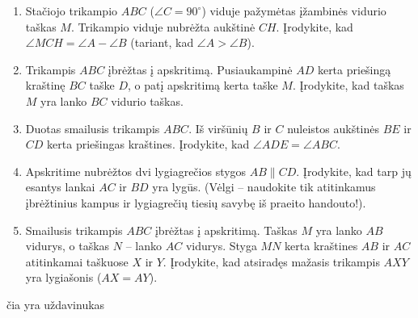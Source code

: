\documentclass[11pt,a4paper]{scrartcl}
\begin{document}
\begin{enumerate}
\begin{itemize}
    \end{itemize}
    \textit{(Šis uždavinys – tai įvadas į kitą mūsų modulį!)}
    \item Stačiojo trikampio $ABC$ ($\angle C = 90^\circ$) viduje pažymėtas įžambinės vidurio taškas $M$. Trikampio viduje nubrėžta aukštinė $CH$. Įrodykite, kad $\angle MCH = \angle A - \angle B$ (tariant, kad $\angle A > \angle B$).
    \item Trikampis $ABC$ įbrėžtas į apskritimą. Pusiaukampinė $AD$ kerta priešingą kraštinę $BC$ taške $D$, o patį apskritimą kerta taške $M$. Įrodykite, kad taškas $M$ yra lanko $BC$ vidurio taškas.
    \item Duotas smailusis trikampis $ABC$. Iš viršūnių $B$ ir $C$ nuleistos aukštinės $BE$ ir $CD$ kerta priešingas kraštines. Įrodykite, kad $\angle ADE = \angle ABC$.
    \item Apskritime nubrėžtos dvi lygiagrečios stygos $AB \parallel CD$. Įrodykite, kad tarp jų esantys lankai $AC$ ir $BD$ yra lygūs. (Vėlgi – naudokite tik atitinkamus įbrėžtinius kampus ir lygiagrečių tiesių savybę iš praeito handouto!).
\item Smailusis trikampis $ABC$ įbrėžtas į apskritimą. Taškas $M$ yra lanko $AB$ vidurys, o taškas $N$ – lanko $AC$ vidurys. Styga $MN$ kerta kraštines $AB$ ir $AC$ atitinkamai taškuose $X$ ir $Y$. Įrodykite, kad atsiradęs mažasis trikampis $AXY$ yra lygiašonis ($AX = AY$). 
\end{enumerate}
\begin{problem}
    čia yra uždavinukas
\end{problem}
\end{document}
